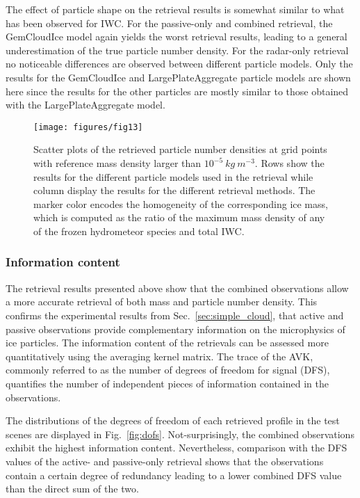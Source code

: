 \documentclass[journal abbreviation, manuscript]{copernicus}
\begin{document}
The effect of particle shape on the retrieval results is somewhat similar to
what has been observed for IWC. For the passive-only and combined retrieval, the
GemCloudIce model again yields the worst retrieval results, leading to a general
underestimation of the true particle number density. For the radar-only
retrieval no noticeable differences are observed between different particle
models. Only the results for the GemCloudIce and LargePlateAggregate particle
models are shown here since the results for the other particles are mostly similar
to those obtained with the LargePlateAggregate model.

\begin{figure}
\centering
\texttt{[image: figures/fig13]}
\caption{Scatter plots of the retrieved particle number densities at grid points
  with reference mass density larger than $10^{-5}\ \unit{kg\ m^{-3}}$. Rows show
  the results for the different particle models used in the retrieval while
  column display the results for the different retrieval methods. The marker
  color encodes the homogeneity of the corresponding ice mass, which is computed
  as the ratio of the maximum mass density of any of the frozen hydrometeor
  species and total IWC.}
\label{fig:results_nd_scatter_a}
\end{figure}

\subsubsection{Information content}

The retrieval results presented above show that the combined observations allow
a more accurate retrieval of both mass and particle number density. This
confirms the experimental results from Sec.~\ref{sec:simple_cloud}, that active
and passive observations provide complementary information on the microphysics
of ice particles. The information content of the retrievals can be assessed more
quantitatively using the averaging kernel matrix. The trace of the AVK, commonly
referred to as the number of degrees of freedom for signal (DFS), quantifies the
number of independent pieces of information contained in the observations.

The distributions of the degrees of freedom of each retrieved profile in the
test scenes are displayed in Fig.~\ref{fig:dofs}. Not-surprisingly, the combined
observations exhibit the highest information content. Nevertheless, comparison
with the DFS values of the active- and passive-only retrieval shows that the
observations contain a certain degree of redundancy leading to a lower combined
DFS value than the direct sum of the two.
\end{document}
